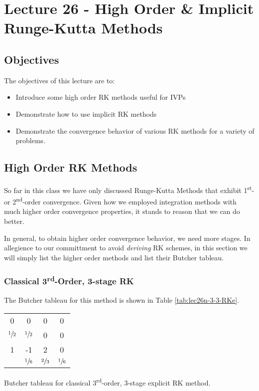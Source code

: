 \chapter{Lecture 26 - High Order \& Implicit Runge-Kutta Methods}
\label{ch:lec26n}
\section{Objectives}
The objectives of this lecture are to:
\begin{itemize}
\item Introduce some high order RK methods useful for IVPs
\item Demonstrate how to use implicit RK methods
\item Demonstrate the convergence behavior of various RK methods for a variety of problems.
\end{itemize}
\setcounter{lstannotation}{0}

\section{High Order RK Methods}
So far in this class we have only discussed Runge-Kutta Methods that exhibit 1\textsuperscript{st}- or 2\textsuperscript{nd}-order convergence.  Given how we employed integration methods with much higher order convergence properties, it stands to reason that we can do better.

In general, to obtain higher order convergence behavior, we need more stages.  In allegience to our committment to avoid \emph{deriving} RK schemes, in this section we will simply list the higher order methods and list their Butcher tableau.

\subsection{Classical 3\textsuperscript{rd}-Order, 3-stage RK}
The Butcher tableau for this method is shown in Table \ref{tab:lec26n-3-3-RKe}.
\begin{margintable}
\begin{tabular}{c|ccc}
0 & 0 & 0 & 0 \\
$\sfrac{1}{2}$ & $\sfrac{1}{2}$ & 0 & 0 \\
1 & -1 & 2 & 0 \\ \hline
  & $\sfrac{1}{6}$ & $\sfrac{2}{3}$ & $\sfrac{1}{6}$ \\
\end{tabular}
\caption{Butcher tableau for classical 3\textsuperscript{rd}-order, 3-stage explicit RK method.}
\label{tab:lec26n-3-3-RKe}
\end{margintable}

